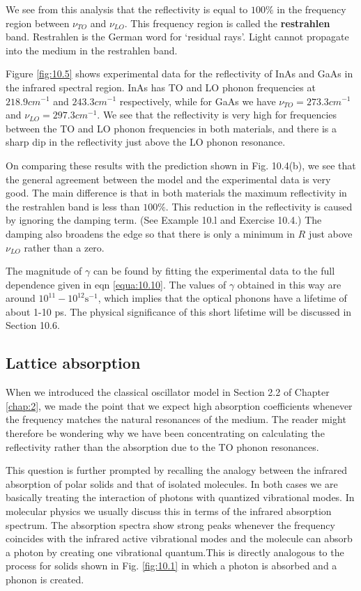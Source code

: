 \documentclass[12pt]{book}
\begin{document}
We see from this analysis that the reflectivity is equal to $100\%$ in the frequency region between $\nu_{TO}$ and $\nu_{LO}$. This frequency region is called the \textbf{restrahlen} band. Restrahlen is the German word for `residual rays'. Light cannot propagate into the medium in the restrahlen band.

Figure \ref{fig:10.5} shows experimental data for the reflectivity of InAs and GaAs in the infrared spectral region. InAs has TO and LO phonon frequencies at $218.9cm^{-1}$ and $243.3cm^{-1}$ respectively, while for GaAs we have $\nu_{TO} = 273.3cm^{-1}$ and $\nu_{LO}=297.3cm^{-1}$. We see that the reflectivity is very high for frequencies between the TO and LO phonon frequencies in both materials, and there is a sharp dip in the reflectivity just above the LO phonon resonance.

On comparing these results with the prediction shown in Fig. 10.4(b), we see that the general agreement between the model and the experimental data is very good. The main difference is that in both materials the maximum reflectivity in the restrahlen band is less than $100\%$. This reduction in the reflectivity is caused by ignoring the damping term. (See Example 10.l and Exercise 10.4.) The damping also broadens the edge so that there is only a minimum in $R$ just above $\nu_{LO}$ rather than a zero.

The magnitude of $\gamma$ can be found by fitting the experimental data to the full dependence given in eqn \ref{equa:10.10}. The values of $\gamma$ obtained in this way are around $10^{11}-10^{12}\mathrm{s^{-1}}$, which implies that the optical phonons have a lifetime of about 1-10 ps. The physical significance of this short lifetime will be discussed in Section 10.6.

\subsection{Lattice absorption}
When we introduced the classical oscillator model in Section 2.2 of Chapter \ref{chap:2}, we made the point that we expect high absorption coefficients whenever the frequency matches the natural resonances of the medium. The reader might therefore be wondering why we have been concentrating on calculating the reflectivity rather than the absorption due to the TO phonon resonances.

This question is further prompted by recalling the analogy between the infrared absorption of polar solids and that of isolated molecules. In both cases we are basically treating the interaction of photons with quantized vibrational modes. In molecular physics we usually discuss this in terms of the infrared absorption spectrum. The absorption spectra show strong peaks whenever the frequency coincides with the infrared active vibrational modes and the molecule can absorb a photon by creating one vibrational quantum.This is directly analogous to the process for solids shown in Fig. \ref{fig:10.1} in which a photon is absorbed and a phonon is created.
\end{document}
